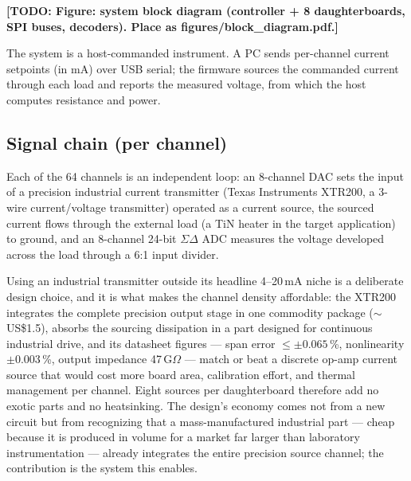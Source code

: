 \documentclass[11pt]{article}
\newif\ifdraft\drafttrue
\newcommand{\todo}[1]{\ifdraft{\color{red}\textbf{[TODO: #1]}}\fi}
\begin{document}
\todo{Figure: system block diagram (controller + 8 daughterboards, SPI buses,
decoders). Place as figures/block\_diagram.pdf.}

The system is a host-commanded instrument. A PC sends per-channel current
setpoints (in mA) over USB serial; the firmware sources the commanded current
through each load and reports the measured voltage, from which the host
computes resistance and power.

\subsection{Signal chain (per channel)}
Each of the 64 channels is an independent loop: an 8-channel DAC sets the input
of a precision industrial current transmitter (Texas Instruments XTR200, a
3-wire current/voltage transmitter) operated as a current source, the sourced
current flows through the external load (a TiN heater in the target
application) to ground, and an 8-channel 24-bit $\Sigma\Delta$ ADC measures the
voltage developed across the load through a 6:1 input divider.

Using an industrial transmitter outside its headline 4--20\,mA niche is a
deliberate design choice, and it is what makes the channel density affordable:
the XTR200 integrates the complete precision output stage in one commodity
package ($\sim$US\$1.5), absorbs the sourcing dissipation in a part designed
for continuous industrial drive, and its datasheet figures --- span error
$\le\pm0.065$\,\%, nonlinearity $\pm0.003$\,\%, output impedance 47\,G$\Omega$
--- match or beat a discrete op-amp current source that would cost more board
area, calibration effort, and thermal management per channel. Eight sources
per daughterboard therefore add no exotic parts and no heatsinking. The
design's economy comes not from a new circuit but from recognizing that a
mass-manufactured industrial part --- cheap because it is produced in volume
for a market far larger than laboratory instrumentation --- already integrates
the entire precision source channel; the contribution is the system this
enables.
\end{document}
